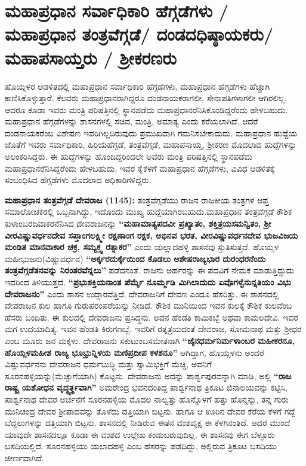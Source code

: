 \newpage

\section{ಮಹಾಪ್ರಧಾನ ಸರ್ವಾಧಿಕಾರಿ ಹೆಗ್ಗಡೆಗಳು / ಮಹಾಪ್ರಧಾನ ತಂತ್ರವೆಗ್ಗಡೆ/ ದಂಡದಧಿಷ್ಠಾಯಕರು/ ಮಹಾಪಸಾಯ್ತರು / ಶ‍್ರೀಕರಣರು}

ಹೊಯ್ಸಳರ ಆಡಳಿತದಲ್ಲಿ ಮಹಾಪ್ರಧಾನ ಸರ್ವಾಧಿಕಾರಿ ಹೆಗ್ಗಡೆಗಳು, ಮಹಾಪ್ರಧಾನ ಹೆಗ್ಗಡೆಗಳು ಹೆಚ್ಚಾಗಿ ಕಾಣಿಸಿಕೊಳ್ಳುತ್ತಾರೆ. ಕೆಲವರು ಮಹಾಪ್ರಧಾನರಾಗಿದ್ದರೂ ದಂಡನಾಯಕರಾಗಲೀ, ಸೇನಾಪತಿಗಳಾಗಲೀ ಆಗಿರಲಿಲ್ಲ. ಆದರೂ ಕೂಡಾ ಇವರು ಮಂತ್ರಿ ಪರಿಷತ್ತಿನಲ್ಲಿ ಸ್ಥಾನಪಡೆದು ಮಹಾಪ್ರಧಾನರೆನಿಸಿಕೊಂಡಿದ್ದರೆಂದು ಹೇಳಬಹುದು. ಮಹಾಪ್ರಧಾನ ಹೆಗ್ಗಡೆಗಳನ್ನು ಶಾಸನಗಳಲ್ಲಿ ಸಚಿವ, ಮಂತ್ರಿ, ಅಮಾತ್ಯ ಎಂದು ಕರೆಯಲಾಗಿದೆ. ಆದರೆ ದಂಡನಾಯಕರೆಂಬ ವಿಶೇಷಣ ಇವರಿಗಿಲ್ಲದಿರುವುದು ಪ್ರಮುಖವಾಗಿ ಗಮನಿಸಬೇಕಾದುದು. ಮಹಾಪ್ರಧಾನ ಹುದ್ದೆಯ ಜೊತೆಗೆ ಇವರು ಸರ್ವಾಧಿಕಾರಿ, ಹಿರಿಯಹೆಗ್ಗಡೆ, ತಂತ್ರವೆಗ್ಗಡೆ, ಮಹಾಪಸಾಯ್ತ, ಶ‍್ರೀಕರಣ ಮೊದಲಾದ ಹುದ್ದೆಗಳನ್ನು ಅಲಂಕರಿಸಿದ್ದರು. ಈ ಹುದ್ದೆಗಳನ್ನು ಹೊಂದಿದ್ದರಿಂದಲೇ ಅವರು ಮಂತ್ರಿ ಪರಿಷತ್ತಿನಲ್ಲಿ ಸ್ಥಾನಪಡೆದು ಮಹಾಪ್ರಧಾನರೆನಿಸಿದ್ದರೆಂದು ಹೇಳಬಹುದು. ಇವರ ಕೈಕೆಳಗೆ ಮಹಾಪ್ರಧಾನ ಹೆಗ್ಗಡೆಗಳು, ವಿವಿಧ ಆಡಳಿತಕ್ಕೆ ಸಂಬಂಧಿಸಿದ ಹೆಗ್ಗಡೆಗಳು ಮೊದಲಾದ ಅಧಿಕಾರಿಗಳಿದ್ದರು.

\textbf{ಮಹಾಪ್ರಧಾನ ತಂತ್ರವೆಗ್ಗಡೆ ದೇವರಾಜ (1145):} ತಂತ್ರವೆಗ್ಗಡೆಯು ರಾಜನ ರಾಜಕೀಯ ತಂತ್ರಗಳ ಆಪ್ತ ಸಮಾಲೋಚಕ\-ರಲ್ಲಿ ಒಬ್ಬನಾಗಿದ್ದು, ಇದೊಂದು ಮುಖ್ಯ ಹುದ್ದೆಯಾಗಿರಬಹುದು.ಮಹಾಪ್ರಧಾನ ತಂತ್ರವೆಗ್ಗಡೆ ಕೌಶಿಕ ಕುಳಾಂಬರ\break ದಿವಾಕರನೆನಿಸಿದ ದೇವರಾಜನನ್ನು \textbf{“ಮಹಾಮಾತ್ಯಪದವೀ ಪ್ರಖ್ಯಾತಂ, ಶಕ್ತಿತ್ರಯಸಮನ್ವಿತಂ, ಶ‍್ರೀ ವೀರವಿಷ್ಣುವರ್ಧನದೇವ ಸಪ್ತಾಂಗಲಕ್ಷ್ಮೀ ರಕ್ಷಣಾಂಗ ರಕ್ಷಕ, ಅಭಿನವ ಭರತ, ವೀರವಿಷ್ಣುವರ್ಧನದೇವ ಭುಜವಿಜಯ ಮಂಡಿತ ಮಾನವಾಕಾರ ಚಕ್ರ, ಸಮ್ಯಕ್ತ್ವ ರತ್ನಾಕರ”} ಎಂದು ಯಲ್ಲಾದಹಳ್ಳಿ ಶಾಸನವು ಸ್ತುತಿಸುತ್ತದೆ. ಹೊಯ್ಸಳ ಮಹೀಭುಜನು(ವಿಷ್ಣುವರ್ಧನ) \textbf{“ಅರ್ಕ್ಕರದುರ್ಕ್ಕೆಯಿಂದ ಕೊಡಲು ಅಶೇಷರಾಜ್ಯಭಾರ ದುರಂಧರನೆಂದು ತಂತ್ರವೆಗ್ಗಡೆತನವನ್ನು ನಿರಂತರವೆನ್ನಲು”} ಪಡೆದನಂತೆ. ರಾಜನು ಅರ್ಹರನ್ನು ಈ ಪದವಿಗೆ ನೇಮಕ ಮಾಡುತ್ತಿದ್ದುದು ಇದರಿಂದ ತಿಳಿಯುತ್ತದೆ. \textbf{“ಪ್ರಭುಶಕ್ತಿಯನಾಂತ ಪೆರ್ಮ್ಮೆ ನೂರ್ಮ್ಮಡಿ ಮಿಗಿಲಾದುದು ಏವೊಗಳ್ವೆನುನ್ನತಿಯಂ ವಿಭು ದೇವರಾಜನಂ” }ಎಂದು ಶಾಸನ ಉದ್ಗಾರವೆತ್ತಿದೆ. ದೇವರಾಜನಿಗೆ ದೇವಣ ಎಂದೂ ಹೆಸರಿತ್ತು. ಈ ಶಾಸನದಲ್ಲಿ ದೇವರಾಜನ ಕುಲ ಹಾಗೂ ಗುರುಪರಂಪರೆಯನ್ನು ನೀಡಿದೆ. ಕೌಶಿಕ ಮುನಿಯಿಂದ ಇವನ ಕುಲಕ್ಕೆ ಕೌಶಿಕ ಕುಲವೆಂಬ ಹೆಸರು ಬಂದಿತು. ಈ ಕುಲದಲ್ಲಿ ದೇವರಾಜನು ಪ್ರಸಿದ್ಧನು. ಅವನ ಹೆಂಡತಿ ಕಾಮಿಕಬ್ಬೆ ಅಥವಾ ಕಾಮಲದೇವಿ. ಇವರ ಮಗ ಉದಯಾದಿತ್ಯ. ಇವನ ಹೆಂಡತಿ ಕಿರುಗಣಬ್ಬೆ. ಇವರಿಗೆ ರತ್ನತ್ರಯದಂತೆ ದೇವರಾಜ, ಸೋಮನಾಥ ಮತ್ತು ಶ‍್ರೀಧರ ಎಂಬ ಮೂರು ಜನ ಮಕ್ಕಳು. ದೇವರಾಜನು ಸಕುಟುಂಬಸಮೇತನಾಗಿ \textbf{“ಜೈನಧರ್ಮನಿರ್ಮಳಾಂಬರ ಮಹೀಕರನೂ, ಹೊಯ್ಸಳಮಹೀಶ ರಾಜ್ಯ ಭೂಭ್ರುನ್ನಿಳಯ ಮಣಿಪ್ರದೀಪ ಕಳಶನೂ”} ಆಗಿದ್ದಾಗ, ಹೊಯ್ಸಳನು ಅಂದರೆ ವಿಷ್ಣುವರ್ಧನನು ದೇವರಾಜನ ಧರ್ಮಬುದ್ಧಿ ಮತ್ತು ಸ್ವಾಮಿಭಕ್ತಿಗೆ ಮೆಚ್ಚಿ, ಅವನಿಗೆ ಸೂರನಹಳ್ಳಿಯನ್ನು(ಮೆಚ್ಚುಗೆಯಾಗಿ) ಕೊಟ್ಟನು. ದೇವರಾಜನು ಅದನ್ನು ಪಾರ್ಶ್ವಪುರವನ್ನಾಗಿ ಮಾಡಿ, ಅಲ್ಲಿ \textbf{“ರಾಜ ರಾಷ್ಟ್ರ ಯಶೋಧನ ವೃದ್ಧ್ಯರ್ತ್ಥವಾಗಿ” }ಅಮರೇಂದ್ರ ಭವನದಂತಿದ್ದ ಪಾರ್ಶ್ವನಾಥ ತ್ರಿಕೂಟ ಜಿನಾಲಯವನ್ನು ಕಟ್ಟಿಸಿ, ಪಾರ್ಶ್ವನಾಥ ದೇವರ ಅರ್ಚನೆಗೆ ಸೂರನಹಳ್ಳಿಯ ಮೊದಲ ನಾಲ್ವತ್ತು ಹೊನ್ನೊಳಗೆ ಹತ್ತು ಹೊನ್ನನ್ನು, ತನ್ನ ಗುರು ಮುನಿಚಂದ್ರ ದೇವರ ಶ‍್ರೀಪಾದವನ್ನು ತೊಳೆದು ದತ್ತಿಯಾಗಿ ಬಿಟ್ಟನು. ಹಾಗೂ ಆ ಊರಿನ ದೇವರ ಕೆರೆಯ ಕೆಳಗೆ ಗದ್ದೆ ಬೆದ್ದಲುಗಳನ್ನು ದತ್ತಿಯಾಗಿ ಬಿಟ್ಟನು. ಶಾಸನದಲ್ಲಿ ನೀಡಿರುವ ಈತನ ವಂಶವೃಕ್ಷ ಈ ಕೆಳಗಿನಂತಿದೆ. ಆದರೆ ಮುಂದೆ ಯಾವುದೇ ಶಾಸನದಲ್ಲೂ ಕೂಡಾ ಈ ವಂಶದ ಉಲ್ಲೇಖ ಕಂಡುಬರುವುದಿಲ್ಲ. ಈ ಶಾಸನವು ಈಗ ಬೆಳ್ಳೂರು ಬಸದಿಯಲ್ಲಿದೆ. ಸೂರನಹಳ್ಳಿಯು ಯಲಾದಹಳ್ಳಿ ಎಂಬ ಹೆಸರನ್ನು ಪಡೆದಿದ್ದು, ಅಲ್ಲಿರುವ ತ್ರಿಕೂಟ ಬಸದಿಯು ಜೀರ್ಣವಾಗಿದೆ.

